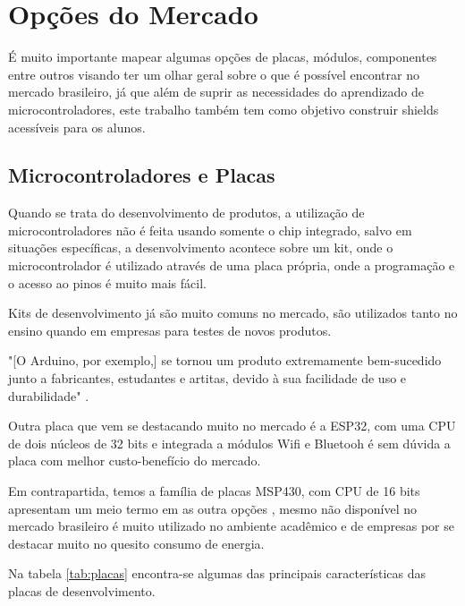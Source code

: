 \section{Opções do Mercado}

É muito importante mapear algumas opções de placas, módulos, componentes entre outros visando ter um olhar geral sobre o que é possível encontrar no mercado brasileiro, já que além de suprir as necessidades do aprendizado de microcontroladores, este trabalho também tem como objetivo construir shields acessíveis para os alunos.

\subsection{Microcontroladores e Placas}

Quando se trata do desenvolvimento de produtos, a utilização de microcontroladores não é feita usando somente o chip integrado, salvo em situações específicas, a desenvolvimento acontece sobre um kit, onde o microcontrolador é utilizado através de uma placa própria, onde a programação e o acesso ao pinos é muito mais fácil.

Kits de desenvolvimento já são muito comuns no mercado, são utilizados tanto no ensino quando em empresas para testes de novos produtos.

"[O Arduino, por exemplo,] se tornou um produto extremamente bem-sucedido junto a fabricantes, estudantes e artitas, devido à sua facilidade de uso e durabilidade" \cite{Monk2013}. 

Outra placa que vem se destacando muito no mercado é a ESP32, com uma CPU de dois núcleos de 32 bits e integrada a módulos Wifi e Bluetooh é sem dúvida a placa com melhor custo-benefício do mercado.

Em contrapartida, temos a família de placas MSP430, com CPU de 16 bits apresentam um meio termo em as outra opções , mesmo não disponível no mercado brasileiro é muito utilizado no ambiente acadêmico e de empresas por se destacar muito no quesito consumo de energia.

Na tabela \ref{tab:placas} encontra-se algumas das principais características das placas de desenvolvimento.


